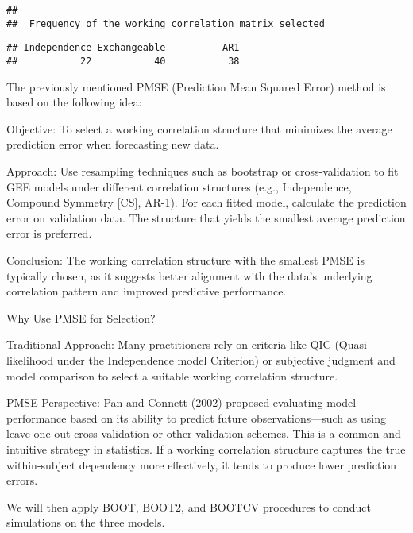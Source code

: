\documentclass[
]{article}
\newenvironment{Shaded}{\begin{snugshade}}{\end{snugshade}}
\newcommand{\FunctionTok}[1]{\textcolor[rgb]{0.13,0.29,0.53}{\textbf{#1}}}
\newcommand{\NormalTok}[1]{#1}
\newcommand{\SpecialCharTok}[1]{\textcolor[rgb]{0.81,0.36,0.00}{\textbf{#1}}}
\begin{document}
\begin{verbatim}
## 
##  Frequency of the working correlation matrix selected
\end{verbatim}

\begin{Shaded}
\end{Shaded}

\begin{verbatim}
## Independence Exchangeable          AR1 
##           22           40           38
\end{verbatim}

The previously mentioned PMSE (Prediction Mean Squared Error) method is
based on the following idea:

Objective: To select a working correlation structure that minimizes the
average prediction error when forecasting new data.

Approach: Use resampling techniques such as bootstrap or
cross-validation to fit GEE models under different correlation
structures (e.g., Independence, Compound Symmetry {[}CS{]}, AR-1). For
each fitted model, calculate the prediction error on validation data.
The structure that yields the smallest average prediction error is
preferred.

Conclusion: The working correlation structure with the smallest PMSE is
typically chosen, as it suggests better alignment with the data's
underlying correlation pattern and improved predictive performance.

Why Use PMSE for Selection?

Traditional Approach: Many practitioners rely on criteria like QIC
(Quasi-likelihood under the Independence model Criterion) or subjective
judgment and model comparison to select a suitable working correlation
structure.

PMSE Perspective: Pan and Connett (2002) proposed evaluating model
performance based on its ability to predict future observations---such
as using leave-one-out cross-validation or other validation schemes.
This is a common and intuitive strategy in statistics. If a working
correlation structure captures the true within-subject dependency more
effectively, it tends to produce lower prediction errors.

We will then apply BOOT, BOOT2, and BOOTCV procedures to conduct
simulations on the three models.
\end{document}
